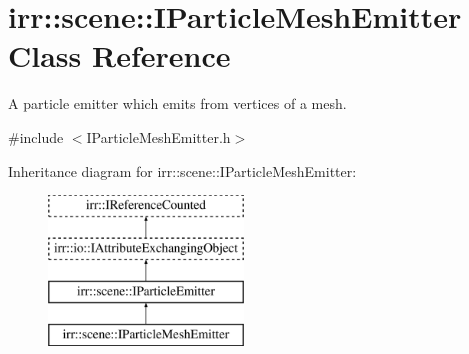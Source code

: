 \hypertarget{classirr_1_1scene_1_1IParticleMeshEmitter}{}\section{irr\+:\+:scene\+:\+:I\+Particle\+Mesh\+Emitter Class Reference}
\label{classirr_1_1scene_1_1IParticleMeshEmitter}


A particle emitter which emits from vertices of a mesh.  




{\ttfamily \#include $<$I\+Particle\+Mesh\+Emitter.\+h$>$}

Inheritance diagram for irr\+:\+:scene\+:\+:I\+Particle\+Mesh\+Emitter\+:\begin{figure}[H]
\begin{center}
\leavevmode
\includegraphics[height=4.000000cm]{classirr_1_1scene_1_1IParticleMeshEmitter}
\end{center}
\end{figure}
